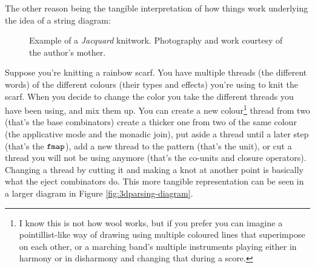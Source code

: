The other reason being the tangible interpretation of how things work
underlying the idea of a string diagram:

\begin{figure}
	\centering
	\caption{Example of a \emph{Jacquard} knitwork. Photography and work courtesy
		of the author's mother.}
	\label{fig:knitting-example}
\end{figure}
Suppose you're knitting a rainbow scarf.
You have multiple threads (the different words) of the different colours (their
types and effects) you're using to knit the scarf.
When you decide to change the color you take the different threads you have
been using, and mix them up.
You can create a new colour\footnote{I know this is not how wool works, but
	if you prefer you can imagine a pointillist-like way of drawing using multiple
	coloured lines that superimpose on each other, or a marching band's multiple
	instruments playing either in harmony or in disharmony and changing that
	during a score.} thread from two (that's the base combinators) create a
thicker one from two of the same colour (the applicative mode and the monadic
join), put aside a thread until a later step (that's the $\texttt{fmap}$), add a new
thread to the pattern (that's the unit), or cut a thread you will not be
using anymore (that's the co-units and closure operators).
Changing a thread by cutting it and making a knot at another point is basically
what the eject combinators do.
This more tangible representation can be seen in a larger diagram in Figure
\ref{fig:3dparsing-diagram}.


